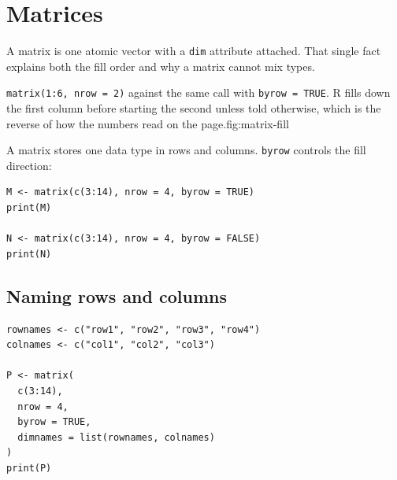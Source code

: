\section{Matrices}

A matrix is one atomic vector with a \texttt{dim} attribute attached. That
single fact explains both the fill order and why a matrix cannot mix types.

\begin{utpfig}{\texttt{matrix(1:6, nrow = 2)} against the same
call with \texttt{byrow = TRUE}. R fills down the first column before starting
the second unless told otherwise, which is the reverse of how the numbers read
on the page.}{fig:matrix-fill}
\end{utpfig}

A matrix stores one data type in rows and columns. \texttt{byrow} controls the fill direction:

\begin{lstlisting}[style=dsr]
M <- matrix(c(3:14), nrow = 4, byrow = TRUE)
print(M)

N <- matrix(c(3:14), nrow = 4, byrow = FALSE)
print(N)
\end{lstlisting}

\subsection{Naming rows and columns}

\begin{lstlisting}[style=dsr]
rownames <- c("row1", "row2", "row3", "row4")
colnames <- c("col1", "col2", "col3")

P <- matrix(
  c(3:14),
  nrow = 4,
  byrow = TRUE,
  dimnames = list(rownames, colnames)
)
print(P)
\end{lstlisting}

